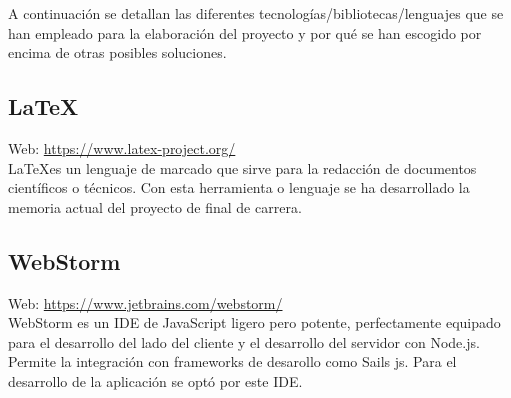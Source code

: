 A continuación se detallan las diferentes tecnologías/bibliotecas/lenguajes que se han empleado para la elaboración del proyecto y por qué se han escogido por encima de otras posibles soluciones.


\subsection{\LaTeX}

Web: \url{https://www.latex-project.org/}\\

\LaTeX es un lenguaje de marcado que sirve para la redacción de documentos científicos o técnicos. Con esta herramienta o lenguaje se ha desarrollado la memoria actual del proyecto de final de carrera.



\subsection{WebStorm}


Web: \url{https://www.jetbrains.com/webstorm/}\\

WebStorm es un IDE de JavaScript ligero pero potente, perfectamente equipado para el desarrollo del lado del cliente y el desarrollo del servidor con Node.js. Permite la integración con frameworks de desarollo como Sails js. Para el desarrollo de la aplicación se optó por este IDE. \\

